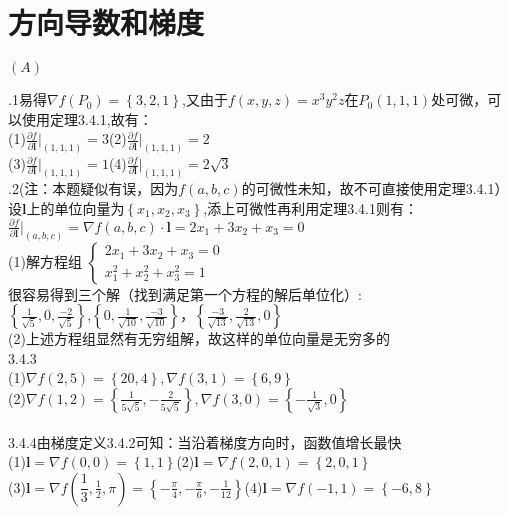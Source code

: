 \documentclass[a4paper,11pt,UTF8]{article}
\begin{document}
\section{方向导数和梯度}
\centerline{$(A)$}
.1\quad 易得$\nabla f(P_0) = \left\{3,2,1\right\}$,又由于$f(x,y,z)=x^3y^2z$在$P_0(1,1,1)$处可微，可以使用定理3.4.1,故有：\\
(1)$\frac{\partial f}{\partial \mathbf{l}}\big|_{(1,1,1)}=3$\qquad   (2)$\frac{\partial f}{\partial \mathbf{l}}\big|_{(1,1,1)}=2$\\
(3)$\frac{\partial f}{\partial \mathbf{l}}\big|_{(1,1,1)}=1$\qquad  (4)$\frac{\partial f}{\partial \mathbf{l}}\big|_{(1,1,1)}=2\sqrt{3}$\\
.2\quad (注：本题疑似有误，因为$f(a,b,c)$的可微性未知，故不可直接使用定理3.4.1）\\
设$\mathbf{l}$上的单位向量为$\left\{x_1,x_2,x_3\right\}$,添上可微性再利用定理3.4.1则有：\\
$\frac{\partial f}{\partial \mathbf{l}}\big|_{(a,b,c)}=\nabla f(a,b,c)\cdot\mathbf{l}=2x_1+3x_2+x_3=0$\\
(1)解方程组
$\begin{cases} 
	2x_1+3x_2+x_3=0 \\
	x_1^2+x_2^2+x_3^2=1
\end{cases}$\\
很容易得到三个解（找到满足第一个方程的解后单位化）:\\
$\left\{\frac{1}{\sqrt{5}},0,\frac{-2}{\sqrt{5}}\right\}$,$\left\{0,\frac{1}{\sqrt{10}},\frac{-3}{\sqrt{10}}\right\}$，$\left\{\frac{-3}{\sqrt{13}},\frac{2}{\sqrt{13}},0\right\}$\\
(2)上述方程组显然有无穷组解，故这样的单位向量是无穷多的\\
3.4.3\quad \\
(1)$\nabla f(2,5)=\left\{20,4\right\},\nabla f(3,1)=\left\{6,9\right\}$\\
(2)$\nabla f(1,2)=\left\{\frac{1}{5\sqrt{5}},-\frac{2}{5\sqrt{5}}\right\},\nabla f(3,0)=\left\{-\frac{1}{\sqrt{3}},0\right\}$\\
\\
3.4.4\quad 由梯度定义3.4.2可知：当沿着梯度方向时，函数值增长最快\\
(1)$\mathbf{l}=\nabla f(0,0)=\left\{1,1\right\}$\qquad(2)$\mathbf{l}=\nabla f(2,0,1)=\left\{2,0,1\right\}$\\
(3)$\mathbf{l}=\nabla f(\dfrac{1}{3},\frac{1}{2},\pi)=\left\{-\frac{\pi}{4},-\frac{\pi}{6},-\frac{1}{12}\right\}$\qquad(4)$\mathbf{l}=\nabla f(-1,1)=\left\{-6,8\right\}$\\
\end{document}
